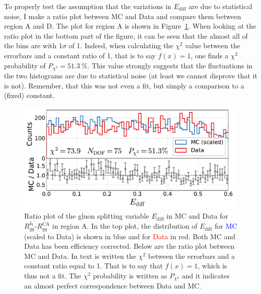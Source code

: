To properly test the assumption that the variations in $E_\mathrm{diff}$ are due to statistical noise, I make a ratio plot between MC and Data and compare them between region A and D. The plot for region A is shown in Figure~\ref{fig:q:ratio_plot_E_diff_region_A}. When looking at the ratio plot in the bottom part of the figure, it can be seen that the almost all of the bins are with $1\sigma$ of \num{1}. Indeed, when calculating the $\chi^2$ value between the errorbars and a constant ratio of \num{1}, that is to say $f(x)=1$, one finds a $\chi^2$ probability of $P_{\chi^2}=\SI{51.3}{\percent}$. This value strongly suggests that the fluctuations in the two histograms are due to statistical noise (at least we cannot disprove that it is not). Remember, that this was not even a fit, but simply a comparison to a (fixed) constant. 

\begin{figure}[h!]
  \centerfloat
  \includegraphics[width=0.99\textwidth, trim=0 0 0 0, clip]{figures/quarks/cut_region_A_ratio_plot-down_sample=1.00-ML_vars=vertex-selection=b-ejet_min=4-n_iter_RS_lgb=99-n_iter_RS_xgb=9-cdot_cut=0.90-version=19-njet=4.pdf}
  \caption[Ratio Plot of $E_\mathrm{diff}$ in MC and Data for $R_{gg}^{k_t}$-$R_{gg}^\mathrm{CA}$ for Region A]
          {Ratio plot of the gluon splitting variable $E_\mathrm{diff}$ in MC and Data for $R_{gg}^{k_t}$-$R_{gg}^\mathrm{CA}$ in region A. In the top plot, the distribution of $E_\mathrm{diff}$ for \textcolor{blue}{MC} (scaled to Data) is shown in blue and for \textcolor{red}{Data} in red. Both MC and Data has been efficiency corrected. Below are the ratio plot between MC and Data. In text is written the $\chi^2$ between the errorbars and a constant ratio equal to \num{1}. That is to say that $f(x)=1$, which is thus not a fit. The $\chi^2$ probability is written as $P_{\chi^2}$ and it indicates an almost perfect correspondence between Data and MC.} 
  \label{fig:q:ratio_plot_E_diff_region_A}
\end{figure}


